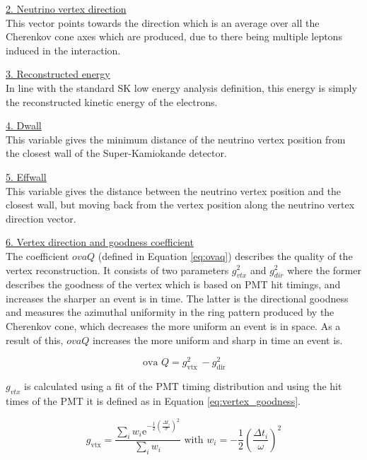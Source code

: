 \noindent
\underline{2. Neutrino vertex direction}\\
\noindent
This vector points towards the direction which is an average over all the Cherenkov cone axes which are produced, due to there being multiple leptons induced in the interaction.


\noindent
\underline{3. Reconstructed energy}\\
\noindent 
In line with the standard SK low energy analysis definition, this energy is simply the reconstructed kinetic energy of the electrons. 


\noindent
\underline{4. Dwall}\\
\noindent 
This variable gives the minimum distance of the neutrino vertex position from the closest wall of the Super-Kamiokande detector.

\noindent
\underline{5. Effwall}\\
\noindent 
This variable gives the distance between the neutrino vertex position and the closest wall, but moving back from the vertex position along the neutrino vertex direction vector.

\noindent
\underline{6. Vertex direction and goodness coefficient}\\
\noindent 
The coefficient $ovaQ$ (defined in Equation \ref{eq:ovaq}) describes the quality of the vertex reconstruction. It consists of two parameters $g^2_{vtx}$ and $g^2_{dir}$ where the former describes the goodness of the vertex which is based on PMT hit timings, and increases the sharper an event is in time. The latter is the directional goodness and measures the azimuthal uniformity in the ring pattern produced by the Cherenkov cone, which decreases the more uniform an event is in space. As a result of this, $ovaQ$ increases the more uniform and sharp in time an event is.

\begin{equation}
    \text { ova } Q=g_{\text {vtx }}^{2}-g_{\text {dir }}^{2}
    \label{eq:ovaq}
\end{equation}

$g_{vtx}$ is calculated using a fit of the PMT timing distribution and using the hit times of the PMT it is defined as in Equation \ref{eq:vertex_goodness}.

\begin{equation}
g_{\mathrm{vtx}}=\frac{\sum_{i} w_{i} \mathrm{e}^{-\frac{1}{2}(\frac{\Delta t_{i}}{\sigma})^{2}}}{\sum_{i} w_{i}} \text { with } w_{i}=-\frac{1}{2}(\frac{\Delta t_{i}}{\omega})^{2}
\label{eq:vertex_goodness}
\end{equation}

